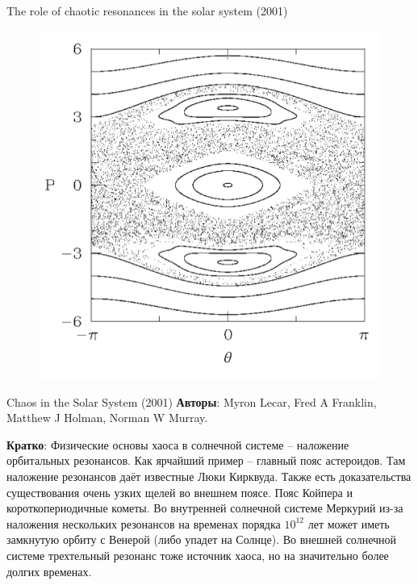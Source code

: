 \documentclass{beamer}
\begin{document}
\begin{frame}{The role of chaotic resonances in the solar system (2001)}
\begin{figure}[h]
\begin{minipage}[h]{0.7\linewidth}
\includegraphics[width=1\linewidth]{./01_2.png}
\end{minipage}
\end{figure}
\end{frame}


\begin{frame}{Chaos in the Solar System (2001)}
        \textbf{Авторы}: Myron Lecar, Fred A Franklin, Matthew J Holman, Norman W Murray.

        \textbf{Кратко}: Физические основы хаоса в солнечной системе -- наложение орбитальных резонансов. Как ярчайший пример -- главный пояс астероидов. Там наложение резонансов даёт известные Люки Кирквуда. Также есть доказательства существования очень узких щелей во внешнем поясе. Пояс Койпера и короткопериодичные кометы. Во внутренней солнечной системе Меркурий из-за наложения нескольких резонансов на временах порядка $10^{12}$ лет может иметь замкнутую орбиту с Венерой (либо упадет на Солнце). Во внешней солнечной системе трехтельный резонанс тоже источник хаоса, но на значительно более долгих временах.

\end{frame}
\end{document}
